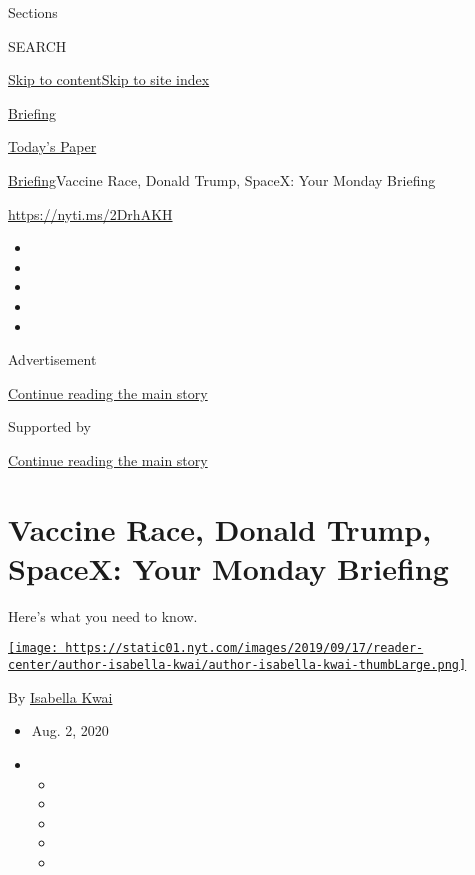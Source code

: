 Sections

SEARCH

\protect\hyperlink{site-content}{Skip to
content}\protect\hyperlink{site-index}{Skip to site index}

\href{https://www.nytimes.com/interactive/2018/briefing/global-morning-briefing-newsletter-signup.html}{Briefing}

\href{https://myaccount.nytimes.com/auth/login?response_type=cookie\&client_id=vi}{}

\href{https://www.nytimes.com/section/todayspaper}{Today's Paper}

\href{/interactive/2018/briefing/global-morning-briefing-newsletter-signup.html}{Briefing}\textbar{}Vaccine
Race, Donald Trump, SpaceX: Your Monday Briefing

\url{https://nyti.ms/2DrhAKH}

\begin{itemize}
\item
\item
\item
\item
\item
\end{itemize}

Advertisement

\protect\hyperlink{after-top}{Continue reading the main story}

Supported by

\protect\hyperlink{after-sponsor}{Continue reading the main story}

\hypertarget{vaccine-race-donald-trump-spacex-your-monday-briefing}{%
\section{Vaccine Race, Donald Trump, SpaceX: Your Monday
Briefing}\label{vaccine-race-donald-trump-spacex-your-monday-briefing}}

Here's what you need to know.

\href{https://www.nytimes.com/by/isabella-kwai}{\texttt{[image: https://static01.nyt.com/images/2019/09/17/reader-center/author-isabella-kwai/author-isabella-kwai-thumbLarge.png]}}

By \href{https://www.nytimes.com/by/isabella-kwai}{Isabella Kwai}

\begin{itemize}
\item
  Aug. 2, 2020
\item
  \begin{itemize}
  \item
  \item
  \item
  \item
  \item
  \end{itemize}
\end{itemize}

